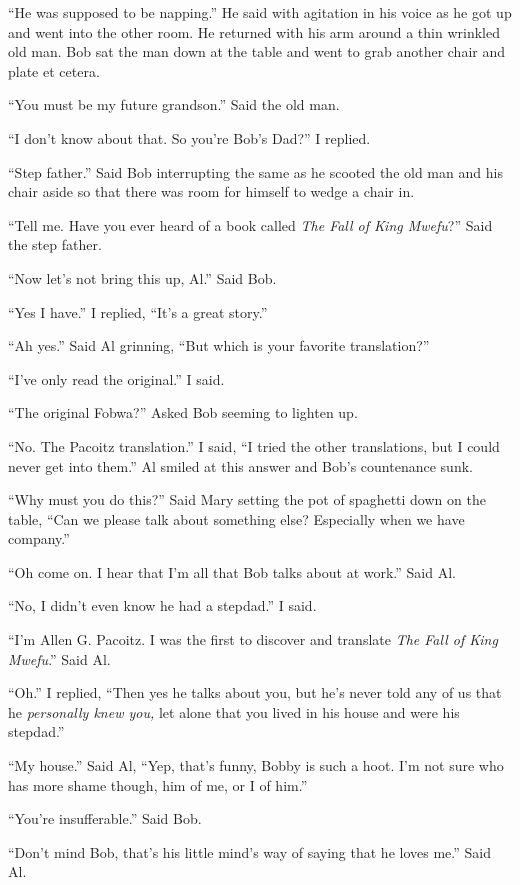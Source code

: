 ``He was supposed to be napping.'' He said with agitation in his voice as he got up and went into the other room. He returned with his arm around a thin wrinkled old man. Bob sat the man down at the table and went to grab another chair and plate et cetera.

``You must be my future grandson.'' Said the old man.

``I don't know about that. So you're Bob's Dad?'' I replied.

``Step father.'' Said Bob interrupting the same as he scooted the old man and his chair aside so that there was room for himself to wedge a chair in.

``Tell me. Have you ever heard of a book called \emph{The Fall of King Mwefu}?'' Said the step father.

``Now let's not bring this up, Al.'' Said Bob.

``Yes I have.'' I replied, ``It's a great story.''

``Ah yes.'' Said Al grinning, ``But which is your favorite translation?''

``I've only read the original.'' I said.

``The original Fobwa?'' Asked Bob seeming to lighten up.

``No. The Pacoitz translation.'' I said, ``I tried the other translations, but I could never get into them.'' Al smiled at this answer and Bob's countenance sunk.

``Why must you do this?'' Said Mary setting the pot of spaghetti down on the table, ``Can we please talk about something else? Especially when we have company.''

``Oh come on. I hear that I'm all that Bob talks about at work.'' Said Al.

``No, I didn't even know he had a stepdad.'' I said.

``I'm Allen G. Pacoitz. I was the first to discover and translate \emph{The Fall of King Mwefu}.'' Said Al.

``Oh.'' I replied, ``Then yes he talks about you, but he's never told any of us that he \emph{personally knew you,} let alone that you lived in his house and were his stepdad.''

``My house.'' Said Al, ``Yep, that's funny, Bobby is such a hoot. I'm not sure who has more shame though, him of me, or I of him.''

``You're insufferable.'' Said Bob.

``Don't mind Bob, that's his little mind's way of saying that he loves me.'' Said Al.

